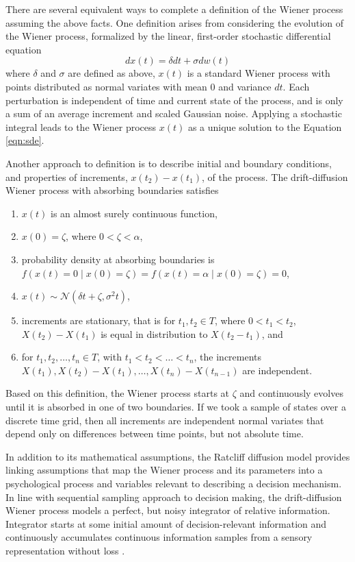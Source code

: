 \documentclass[12pt]{report}
\begin{document}
There are several equivalent ways to
complete a definition of the Wiener process assuming the above facts.
One definition arises from considering the evolution of the Wiener process,
formalized by the linear, first-order stochastic  differential equation 
% 
\begin{equation}
\label{eqn:sde}
dx(t) = \delta dt + \sigma dw(t) 
\end{equation} 
% 
where $\delta$ and $\sigma$ are defined as above, $x(t)$ is a
standard Wiener process with points distributed as normal
variates with mean 0 and variance $dt$. Each perturbation is independent of time and current state of the process, and is only a sum of an average increment and scaled Gaussian noise. Applying a stochastic integral leads to the Wiener process $x(t)$ as a unique solution to the Equation \ref{eqn:sde}. 

Another approach to definition is to describe initial and boundary conditions, and properties
of increments, $x(t_2) - x(t_1)$, of the process. The drift-diffusion Wiener process with absorbing boundaries 
satisfies
%
\begin{enumerate} 
\item $x(t)$ is an almost surely continuous function,
%
\item $x(0) = \zeta$, where $0 < \zeta < \alpha$,
%
\item probability density at absorbing boundaries is $f(x(t) = 0 \mid x(0) = \zeta) = f(x(t) = \alpha \mid x(0) = \zeta) = 0$,
%
\item $x(t) \sim \mathcal{N}(\delta t + \zeta, \sigma^2 t)$,
%
\item increments are stationary, that is for $t_1, t_2 \in T$, where $0 < t_1 < t_2$, $X(t_2) - X(t_1)$ is equal in distribution to $X(t_2 - t_1)$, and
%
\item for $t_1, t_2, \ldots, t_n \in T$, with $t_1 < t_2 < \ldots < t_n$, the increments $X(t_1),
X(t_2) - X(t_1), \ldots, X(t_n) - X(t_{n-1})$ are independent.
\end{enumerate} 
%
Based on this definition, the Wiener process starts at $\zeta$ and continuously evolves until it is absorbed in one of two boundaries. If we took a sample of states over a discrete time grid, then all  increments are independent normal variates that depend only on differences between time points, but not absolute time.  

In addition to its mathematical assumptions, the Ratcliff
diffusion model provides linking assumptions that
map the Wiener process and its parameters into a psychological process and variables relevant to describing a decision mechanism. In line with sequential sampling approach to decision making, the drift-diffusion Wiener process models a perfect, but noisy integrator of relative information. Integrator starts at some initial amount of decision-relevant information and continuously accumulates continuous information samples from a sensory representation without loss \citep{Smi2000,BogBro2006}.
\end{document}
